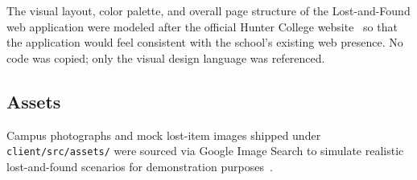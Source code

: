 \documentclass[11pt]{article}
\begin{document}
The visual layout, color palette, and overall page structure of the
Lost-and-Found web application were modeled after the official Hunter
College website~\cite{hunter_college_site} so that the application
would feel consistent with the school's existing web presence. No
code was copied; only the visual design language was referenced.

\subsection*{Assets}

Campus photographs and mock lost-item images shipped under
\texttt{client/src/assets/} were sourced via Google Image Search to
simulate realistic lost-and-found scenarios for demonstration
purposes~\cite{assets_images}.



\end{document}
